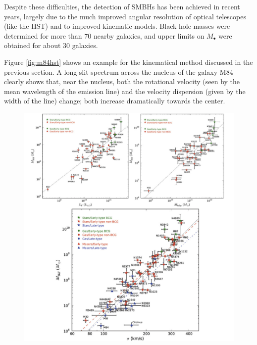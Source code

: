 \documentclass[a4paper,11pt]{article}
\begin{document}
{\noindent}Despite these difficulties, the detection of SMBHs has been achieved in recent years, largely due to the much improved angular resolution of optical telescopes (like the HST) and to improved kinematic models. Black hole masses were determined for more than $70$ nearby galaxies, and upper limits on $M_\bullet$ were obtained for about $30$ galaxies.

Figure \ref{fig:m84hst} shows an example for the kinematical method discussed in the previous section. A long-slit spectrum across the nucleus of the galaxy M84 clearly shows that, near the nucleus, both the rotational velocity (seen by the mean wavelength of the emission line) and the velocity dispersion (given by the width of the line) change; both increase dramatically towards the center.

\begin{figure}[t!]
    \centering
    \includegraphics[width=15cm]{figures/BHcorrelations.png}

\end{figure}
\end{document}
